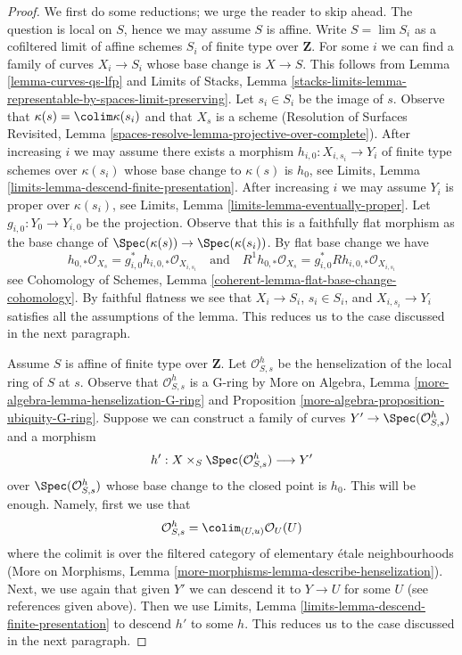 \begin{proof}
We first do some reductions; we urge the reader to skip ahead.
The question is local on $S$, hence we may assume $S$ is affine.
Write $S = \lim S_i$ as a cofiltered limit of affine schemes $S_i$
of finite type over $\mathbf{Z}$.
For some $i$ we can find a family of curves $X_i \to S_i$
whose base change is $X \to S$. This follows from
Lemma \ref{lemma-curves-qs-lfp} and Limits of Stacks, Lemma
\ref{stacks-limits-lemma-representable-by-spaces-limit-preserving}.
Let $s_i \in S_i$ be the image of $s$. Observe that
$\kappa(s) = \colim \kappa(s_i)$ and that $X_s$ is a scheme
(Resolution of Surfaces Revisited, Lemma
\ref{spaces-resolve-lemma-projective-over-complete}).
After increasing $i$ we may assume there exists a morphism
$h_{i, 0} : X_{i, s_i} \to Y_i$
of finite type schemes over $\kappa(s_i)$ whose base change to
$\kappa(s)$ is $h_0$, see
Limits, Lemma \ref{limits-lemma-descend-finite-presentation}.
After increasing $i$ we may assume $Y_i$ is proper over $\kappa(s_i)$, see
Limits, Lemma \ref{limits-lemma-eventually-proper}.
Let $g_{i, 0} : Y_0 \to Y_{i, 0}$ be the projection. Observe that
this is a faithfully flat morphism as the base change of
$\Spec(\kappa(s)) \to \Spec(\kappa(s_i))$.
By flat base change we have
$$
h_{0, *}\mathcal{O}_{X_s} = g_{i, 0}^*h_{i, 0, *}\mathcal{O}_{X_{i, s_i}}
\quad\text{and}\quad
R^1h_{0, *}\mathcal{O}_{X_s} = g_{i, 0}^*Rh_{i, 0, *}\mathcal{O}_{X_{i, s_i}}
$$
see Cohomology of Schemes, Lemma
\ref{coherent-lemma-flat-base-change-cohomology}.
By faithful flatness we see that $X_i \to S_i$, $s_i \in S_i$, and
$X_{i, s_i} \to Y_i$ satisfies all the assumptions of the lemma.
This reduces us to the case discussed in the next paragraph.

\medskip\noindent
Assume $S$ is affine of finite type over $\mathbf{Z}$.
Let $\mathcal{O}_{S, s}^h$ be the henselization of the local
ring of $S$ at $s$. Observe that $\mathcal{O}_{S, s}^h$ is a G-ring by
More on Algebra, Lemma \ref{more-algebra-lemma-henselization-G-ring} and
Proposition \ref{more-algebra-proposition-ubiquity-G-ring}.
Suppose we can construct a family of curves
$Y' \to \Spec(\mathcal{O}_{S, s}^h)$ and a morphism
$$
h' : X \times_S \Spec(\mathcal{O}_{S, s}^h) \longrightarrow Y'
$$
over $\Spec(\mathcal{O}_{S, s}^h)$ whose base change to the closed
point is $h_0$. This will be enough. Namely, first we use that
$$
\mathcal{O}_{S, s}^h = \colim_{(U, u)} \mathcal{O}_U(U)
$$
where the colimit is over the filtered category of 
elementary \'etale neighbourhoods (More on Morphisms, Lemma
\ref{more-morphisms-lemma-describe-henselization}).
Next, we use again that given $Y'$ we can descend it to
$Y \to U$ for some $U$ (see references given above).
Then we use
Limits, Lemma \ref{limits-lemma-descend-finite-presentation}
to descend $h'$ to some $h$. This reduces us to the case
discussed in the next paragraph.


\end{proof}
